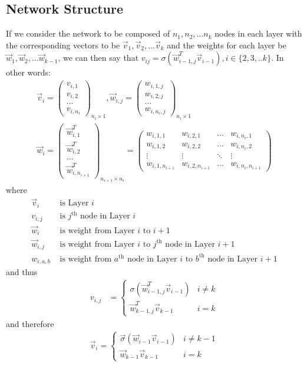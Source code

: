 \documentclass{article}
\begin{document}
\subsection{Network Structure}
If we consider the network to be composed of $n_1, n_2, ... n_k$ nodes in each layer with the corresponding vectors to be $\vec v_1,\vec v_2, ... \vec v_k$ and the weights for each layer be $ \vec w_1, \vec w_2, ... \vec w_{k-1}$, we can then say that $v_{ij}=\sigma(\vec w_{i-1,j}^T \vec v_{i-1}), i\in\{2,3,..k\}$. In other words: 
\begin{gather*}
\vec v_i=\begin{pmatrix}v_{i,1}\\v_{i,2}\\...\\v_{i,n_i}\end{pmatrix}_{n_i\times1},
\vec w_{i,j}=\begin{pmatrix}w_{i,1,j}\\w_{i,2,j}\\...\\w_{i,n_i,j}\end{pmatrix}_{n_i\times 1}\\
\vec w_{i}=\begin{pmatrix}\vec w_{i,1}^T\\\vec w_{i,2}^T\\...\\\vec w_{i,n_{i+1}}^T\end{pmatrix}_{n_{i+1}\times n_i}=\begin{pmatrix}w_{i,1,1}&w_{i,2,1}&...&w_{i,n_{i},1}\\w_{i,1,2}&w_{i,2,2}&...&w_{i,n_{i},2}\\\vdots&\vdots&\ddots&\vdots\\w_{i,1,n_{i+1}}&w_{i,2,n_{i+1}}&...&w_{i,n_i,n_{i+1}}\end{pmatrix}
\end{gather*}
where
\begin{align*}
\vec v_i&\text{ is Layer $i$}\\
v_{i,j}&\text{ is $j^\text{th}$ node in Layer $i$}\\
\vec w_i&\text{ is weight from Layer $i$ to $i+1$}\\
\vec w_{i,j}&\text{ is weight from Layer $i$ to $j^\text{th}$ node in Layer $i+1$}\\
w_{i,a,b}&\text{ is weight from $a^\text{th}$ node in Layer $i$ to $b^\text{th}$ node in Layer $i+1$}
\end{align*}
and thus
\begin{align*}
v_{i,j} &=\begin{cases}\sigma(\vec w_{i-1,j}^T\vec v_{i-1})&i\ne k\\\vec w_{k-1,j}^T\vec v_{k-1}&i=k\end{cases}
\end{align*}
and therefore
\begin{align*}
\vec v_i= \begin{cases}\vec \sigma (\vec w_{i-1}\vec v_{i-1})&i\ne k-1\\\vec w_{k-1}\vec v_{k-1}&i=k\end{cases}
\end{align*}
\end{document}
